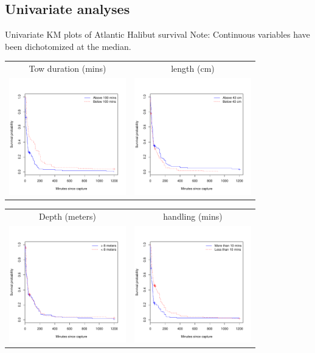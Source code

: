 \documentclass[envcountsect, 10pt, portrait, palatino]{beamer}
\begin{document}
\subsection{Univariate analyses}
\begin{frame}{Univariate KM plots of Atlantic Halibut survival}
Note: Continuous variables have been dichotomized at the median.\\[2ex]
\begin{tabular}{cc}
Tow duration (mins) & length (cm)\\
\includegraphics[width=2.0in]{towdur.pdf} &
\includegraphics[width=2.0in]{length.pdf}
\end{tabular}
\end{frame}
\begin{frame}
\begin{tabular}{cc}
Depth (meters) & handling (mins)\\
\includegraphics[width=2in]{depth.pdf} &
\includegraphics[width=2in]{handling.pdf}
\end{tabular}
\end{frame}
\end{document}
